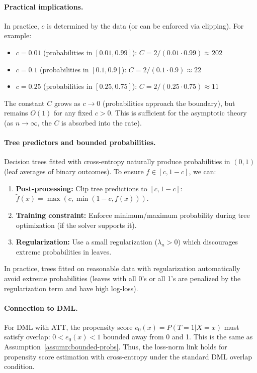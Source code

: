 \paragraph{Practical implications.}
In practice, $c$ is determined by the data (or can be enforced via clipping). For example:
\begin{itemize}
\item $c = 0.01$ (probabilities in $[0.01, 0.99]$): $C = 2/(0.01 \cdot 0.99) \approx 202$
\item $c = 0.1$ (probabilities in $[0.1, 0.9]$): $C = 2/(0.1 \cdot 0.9) \approx 22$
\item $c = 0.25$ (probabilities in $[0.25, 0.75]$): $C = 2/(0.25 \cdot 0.75) \approx 11$
\end{itemize}

The constant $C$ grows as $c \to 0$ (probabilities approach the boundary), but remains $O(1)$ for any fixed $c > 0$. This is sufficient for the asymptotic theory (as $n \to \infty$, the $C$ is absorbed into the rate).

\paragraph{Tree predictors and bounded probabilities.}
Decision trees fitted with cross-entropy naturally produce probabilities in $(0,1)$ (leaf averages of binary outcomes). To ensure $f \in [c, 1-c]$, we can:
\begin{enumerate}
\item \textbf{Post-processing:} Clip tree predictions to $[c, 1-c]$: $\tilde{f}(x) = \max(c, \min(1-c, f(x)))$.
\item \textbf{Training constraint:} Enforce minimum/maximum probability during tree optimization (if the solver supports it).
\item \textbf{Regularization:} Use a small regularization ($\lambda_n > 0$) which discourages extreme probabilities in leaves.
\end{enumerate}

In practice, trees fitted on reasonable data with regularization automatically avoid extreme probabilities (leaves with all 0's or all 1's are penalized by the regularization term and have high log-loss).

\paragraph{Connection to DML.}
For DML with ATT, the propensity score $e_0(x) = P(T=1|X=x)$ must satisfy overlap: $0 < e_0(x) < 1$ bounded away from 0 and 1. This is the same as Assumption~\ref{assump:bounded-probs}. Thus, the loss-norm link holds for propensity score estimation with cross-entropy under the standard DML overlap condition.


